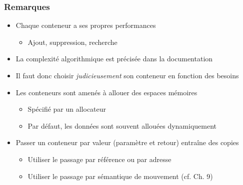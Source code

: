 \begin{frame}
\frametitle{Remarques}
\begin{itemize}[<+->]
\item Chaque conteneur a ses propres performances
	\begin{itemize}
	\item Ajout, suppression, recherche
	\end{itemize}
\item La complexité algorithmique est précisée dans la documentation
\item Il faut donc choisir \emph{judicieusement} son conteneur en fonction des besoins
\item Les conteneurs sont amenés à allouer des espaces mémoires
	\begin{itemize}
	\item Spécifié par un allocateur
	\item Par défaut, les données sont souvent allouées dynamiquement
	\end{itemize}
\item Passer un conteneur par valeur (paramètre et retour) entraîne des copies
	\begin{itemize}
	\item Utiliser le passage par référence ou par adresse
	\item Utiliser le passage par sémantique de mouvement (cf. Ch. 9)
	\end{itemize}
\end{itemize}
\end{frame}

